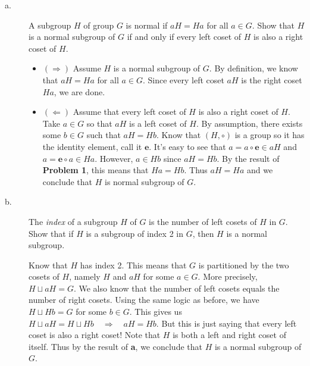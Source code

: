 \documentclass[../hw_sols.tex]{subfiles}
\begin{document}
\begin{description}

\item[a.] A subgroup $H$ of group $G$ is normal if $aH = Ha$ for all 
$a \in G$. Show that $H$ is a normal subgroup of $G$ if and only if every left 
coset of $H$ is also a right coset of $H$.

\begin{solution}
\begin{itemize}
	\item $(\Rightarrow)$ Assume $H$ is a normal subgroup of $G$. By 
	definition, we know that $aH = Ha$ for all $a \in G$. Since every left 
	coset $aH$ is the right coset $Ha$, we are done.

	\item $(\Leftarrow)$ Assume that every left coset of $H$ is also a right 
	coset of $H$. Take $a \in G$ so that $aH$ is a left coset of $H$. By 
	assumption, there exists some $b \in G$ such that $aH = Hb$. Know that 
	$(H, \circ)$ is a group so it has the identity element, call it 
	$\textbf{e}$. It's easy to see that $a = a \circ \textbf{e} \in aH$ and 
	$a = \textbf{e} \circ a \in Ha$. However, $a \in Hb$ since $aH = Hb$. By 
	the result of \textbf{Problem 1}, this means that $Ha = Hb$. Thus 
	$aH = Ha$ and we conclude that $H$ is normal subgroup of $G$.
\end{itemize}
\end{solution}


\item[b.] The \textit{index} of a subgroup $H$ of $G$ is the number of left 
cosets of $H$ in $G$. Show that if $H$ is a subgroup of index 2 in $G$, then 
$H$ is a normal subgroup.

\begin{solution}
Know that $H$ has index 2. This means that $G$ is partitioned by the two 
cosets of $H$, namely $H$ and $aH$ for some $a \in G$. More precisely, 
$H \sqcup aH = G$. We also know that the number of left cosets equals the 
number of right cosets. Using the same logic as before, we have 
$H \sqcup Hb = G$ for some $b \in G$. This gives us 
$H \sqcup aH = H \sqcup Hb \quad \Rightarrow \quad aH = Hb$. But this is just 
saying that every left coset is also a right coset! Note that $H$ is both a 
left and right coset of itself. Thus by the result of \textbf{a}, we conclude 
that $H$ is a normal subgroup of $G$.
\end{solution}

\end{description}
\end{document}
